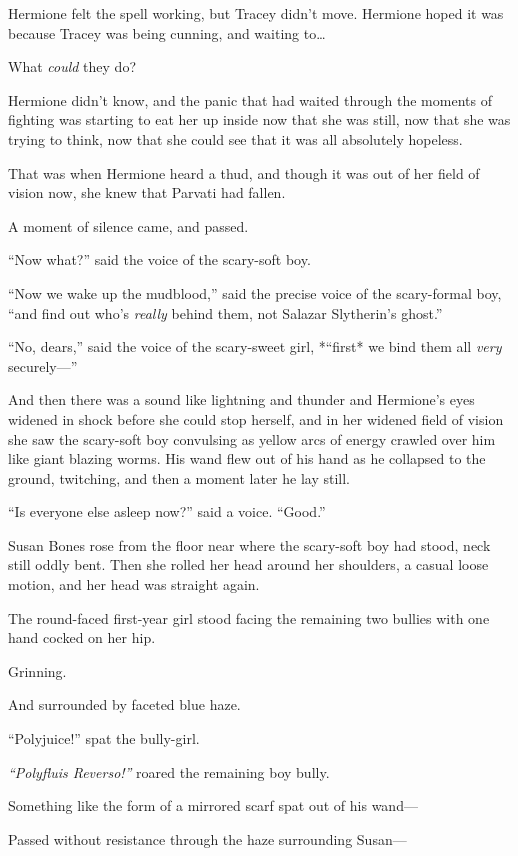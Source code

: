 Hermione felt the spell working, but Tracey didn't move. Hermione hoped
it was because Tracey was being cunning, and waiting to\ldots{}

What \emph{could} they do?

Hermione didn't know, and the panic that had waited through the moments
of fighting was starting to eat her up inside now that she was still,
now that she was trying to think, now that she could see that it was all
absolutely hopeless.

That was when Hermione heard a thud, and though it was out of her field
of vision now, she knew that Parvati had fallen.

A moment of silence came, and passed.

``Now what?'' said the voice of the scary-soft boy.

``Now we wake up the mudblood,'' said the precise voice of the
scary-formal boy, ``and find out who's \emph{really} behind them, not
Salazar Slytherin's ghost.''

``No, dears,'' said the voice of the scary-sweet girl, *``first* we bind
them all \emph{very} securely---''

And then there was a sound like lightning and thunder and Hermione's
eyes widened in shock before she could stop herself, and in her widened
field of vision she saw the scary-soft boy convulsing as yellow arcs of
energy crawled over him like giant blazing worms. His wand flew out of
his hand as he collapsed to the ground, twitching, and then a moment
later he lay still.

``Is everyone else asleep now?'' said a voice. ``Good.''

Susan Bones rose from the floor near where the scary-soft boy had stood,
neck still oddly bent. Then she rolled her head around her shoulders, a
casual loose motion, and her head was straight again.

The round-faced first-year girl stood facing the remaining two bullies
with one hand cocked on her hip.

Grinning.

And surrounded by faceted blue haze.

``Polyjuice!'' spat the bully-girl.

\emph{``Polyfluis Reverso!''} roared the remaining boy bully.

Something like the form of a mirrored scarf spat out of his wand---

Passed without resistance through the haze surrounding Susan---


